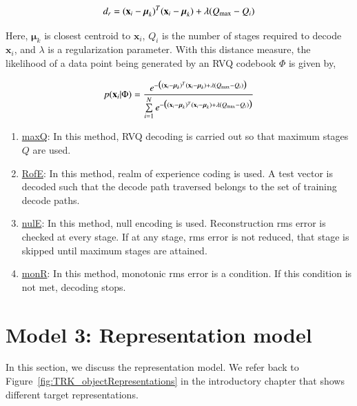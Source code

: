 \begin{equation}
d_r = (\mathbf{x}_i-\boldsymbol\mu_k)^T(\mathbf{x}_i-\boldsymbol\mu_k) + \lambda({Q_{\textrm{max}}-Q_i})
\end{equation}

Here, $\boldsymbol\mu_k$ is closest centroid to $\mathbf{x}_i$, $Q_i$ is the number of stages required to decode $\mathbf{x}_i$, and $\lambda$ is a regularization parameter.  With this distance measure, the likelihood of a data point being generated by an RVQ codebook $\Phi$ is given by,

\begin{equation}
p(\mathbf{x}_i|\Phi) = \frac{e^{-\big((\mathbf{x}_i-\boldsymbol\mu_k)^T(\mathbf{x}_i-\boldsymbol\mu_k) + \lambda({Q_{\textrm{max}}-Q_i})\big)}} {\sum\limits_{i=1}^N e^{-\big((\mathbf{x}_i-\boldsymbol\mu_k)^T(\mathbf{x}_i-\boldsymbol\mu_k) + \lambda({Q_{\textrm{max}}-Q_i})\big)}}
\end{equation}

\begin{enumerate}
\item \underline{maxQ}: In this method, RVQ decoding is carried out so that maximum stages $Q$ are used.
\item \underline{RofE}: In this method, realm of experience coding is used.  A test vector is decoded such that the decode path traversed belongs to the set of training decode paths.
\item \underline{nulE}: In this method, null encoding is used.  Reconstruction rms error is checked at every stage.  If at any stage, rms error is not reduced, that stage is skipped until maximum stages are attained.
\item \underline{monR}: In this method, monotonic rms error is a condition.  If this condition is not met, decoding stops.
\end{enumerate}

\section{Model 3: Representation model}
\label{Sec:Representation_model}
In this section, we discuss the representation model.  We refer back to Figure~\ref{fig:TRK_objectRepresentations} in the introductory chapter that shows different target representations.  




